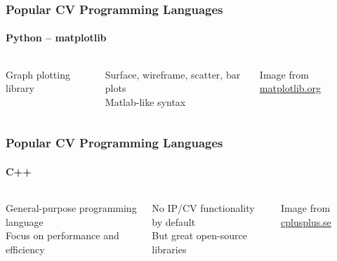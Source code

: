 \documentclass[xetex,professionalfont]{beamer}
\begin{document}

\begin{frame}
\frametitle{Popular CV Programming Languages}
\framesubtitle{Python -- matplotlib}

\begin{columns}

Graph plotting library

\bigskip
Surface, wireframe, scatter, bar plots\\\medskip
Matlab-like syntax


\begin{center}
{
	{\centering Image from \url{matplotlib.org}}}
\end{center}

\end{columns}

\end{frame}


\begin{frame}
\frametitle{Popular CV Programming Languages}
\framesubtitle{C++}

\begin{columns}

General-purpose programming language \\
Focus on performance and efficiency 

\bigskip
No IP/CV functionality by default \\
But great open-source libraries


\begin{center}
{
	{\centering Image from \url{cplusplus.se}}}
\end{center}

\end{columns}

\end{frame}
\end{document}
